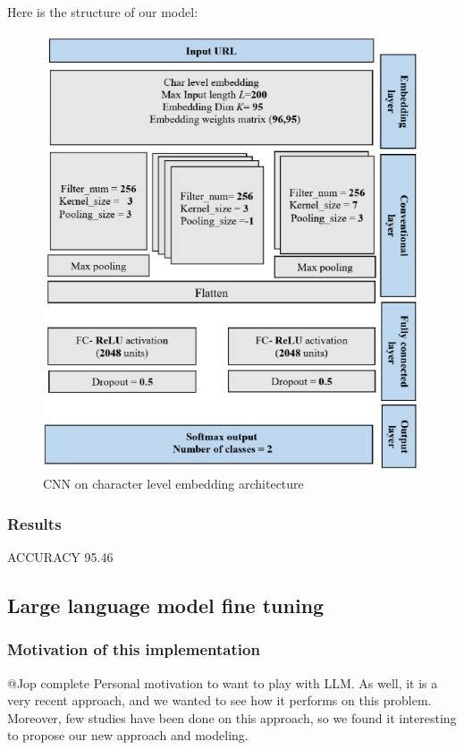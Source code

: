 \documentclass{article}
\begin{document}
    Here is the structure of our model:
    \begin{figure}[H]
        \centering
        \includegraphics[width=0.8\linewidth]{report_img/cnn_configuration}
        \caption{CNN on character level embedding architecture}
        \label{fig:CNN}
    \end{figure}

    \subsubsection{Results}

    \cite{CharacterLevelCNN} ACCURACY 95.46

    \subsection{Large language model fine tuning}\label{subsec:large-language-model-finetuning}

    \subsubsection{Motivation of this implementation}
    @Jop complete
    Personal motivation to want to play with LLM. As well, it is a very recent approach, and we wanted to see how it performs on this problem.
    Moreover, few studies have been done on this approach, so we found it interesting to propose our new approach and modeling.
\end{document}

